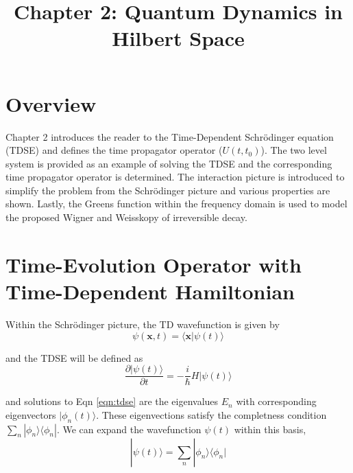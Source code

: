 \documentclass{article}
\title{Chapter 2: Quantum Dynamics in Hilbert Space} %
\begin{document}
\maketitle

\section{Overview}

Chapter 2 introduces the reader to the Time-Dependent Schr{\"o}dinger equation (TDSE)
and defines the time propagator operator ($U(t,t_0)$). The two level system is
provided as an example of solving the TDSE and the corresponding time propagator operator
is determined. The interaction picture is introduced to simplify the
problem from the Schr{\"o}dinger picture and various properties are shown. Lastly,
the Greens function within the frequency domain is used to model the proposed
Wigner and Weisskopy of irreversible decay.

\section*{Time-Evolution Operator with Time-Dependent Hamiltonian}

Within the Schr{\"o}dinger picture, the TD wavefunction is given by
\begin{equation}
  \psi(\mathbf{x},t) = \langle \mathbf{x}|\psi(t)\rangle
\end{equation}

and the TDSE will be defined as
\begin{equation}
  \frac{\partial|\psi(t)\rangle}{\partial t} = -\frac{i}{\hbar}H|\psi(t)\rangle
  \label{eqn:tdse}
\end{equation}

and solutions to Eqn \eqref{eqn:tdse} are the eigenvalues $E_n$ with corresponding
eigenvectors $|\phi_n(t)\rangle$. These eigenvections satisfy the completness
condition $\sum_n|\phi_n\rangle\langle\phi_n|$. We can expand the wavefunction
$\psi(t)$ within this basis,
\begin{equation}
  |\psi(t)\rangle = \sum_n|\phi_n\rangle\langle\phi_n|
  \label{eqn:basis_expan}
\end{equation}
\end{document}
